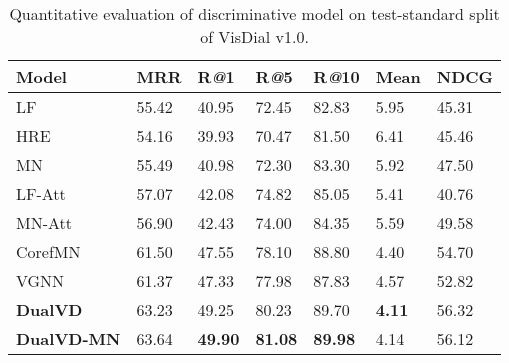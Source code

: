 \documentclass[letterpaper]{article} \usepackage{aaai20}  \usepackage{times}  \usepackage{helvet} \usepackage{courier}  \usepackage[hyphens]{url}  \usepackage{graphicx} \urlstyle{rm} \def\UrlFont{\rm}  \usepackage{graphicx}  \frenchspacing  \setlength{\pdfpagewidth}{8.5in}  \setlength{\pdfpageheight}{11in}  \usepackage{mathrsfs} \usepackage{amsfonts,amssymb}  \usepackage{tabularx} \usepackage{url}
\begin{document}
\begin{table}[t] 
\caption{Quantitative evaluation of discriminative model on test-standard split of VisDial v1.0.}
\label{v1}
\begin{tabular}{L{1.66cm}C{0.6cm}C{0.6cm}C{0.6cm}C{0.69cm}C{0.6cm}C{0.77cm}}
\hline                       
Model & MRR & R\textsl{@}1 & R\textsl{@}5 & R\textsl{@}10 & Mean & NDCG  \\
\hline  
LF &55.42 & 40.95 & 72.45 & 82.83 & 5.95 & 45.31 \\
HRE & 54.16 & 39.93 & 70.47 & 81.50 & 6.41& 45.46 \\  
MN & 55.49 & 40.98 & 72.30 & 83.30 & 5.92 &47.50\\  
LF-Att &57.07&42.08&74.82&85.05&5.41&40.76\\
MN-Att & 56.90 & 42.43 & 74.00 & 84.35 & 5.59 & 49.58\\
CorefMN & 61.50 & 47.55 & 78.10 & 88.80 & 4.40 &54.70\\
VGNN & 61.37 &47.33 &77.98&87.83&4.57&52.82\\
\hline
\textbf{DualVD} & 63.23 & 49.25 & 80.23 & 89.70 & \textbf{4.11} & 56.32\\
\textbf{DualVD-MN} & 63.64 & \textbf{49.90} & \textbf{81.08} & \textbf{89.98} & 4.14 &56.12\\
\hline  
\end{tabular}  
\end{table}

\fi
\begin{table}[t]
\caption{Comparison on validation split of VisDial v0.9.}
\label{v9}
\end{table}  
\end{document}
